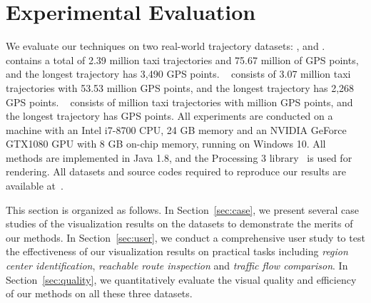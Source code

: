 \section{Experimental Evaluation}\label{sec:exp}
We evaluate our techniques on two real-world trajectory datasets: \pt{}, \sz{} and \cd{}.
\pt{}~\cite{pt} contains a total of 2.39 million taxi trajectories and 75.67 million of GPS points, and the longest trajectory has 3,490 GPS points.
\sz{}~\cite{sz} consists of 3.07 million taxi trajectories with 53.53 million GPS points, and the longest trajectory has 2,268 GPS points. 
\cd{}~\cite{cd} consists of  million taxi trajectories with  million GPS points, and the longest trajectory has  GPS points.  All experiments are conducted on a machine with an Intel i7-8700 CPU, 24 GB memory and an NVIDIA GeForce GTX1080 GPU with 8 GB on-chip memory, running on Windows 10. All methods are implemented in Java 1.8, and the Processing 3 library~\cite{p3} is used for rendering. All datasets and source codes required to reproduce our results are available at~\cite{code}.

This section is organized as follows.
In Section~\ref{sec:case}, we present several case studies of the visualization results on the \pt{} datasets to demonstrate the merits of our methods.
In Section~\ref{sec:user}, we conduct a comprehensive user study to test the effectiveness of our visualization results on practical tasks including \textit{region center identification}, \textit{reachable route inspection} and \textit{traffic flow comparison}. In Section~\ref{sec:quality}, we quantitatively evaluate the visual quality and efficiency of our methods on all these three datasets.

\trim \trim




%

